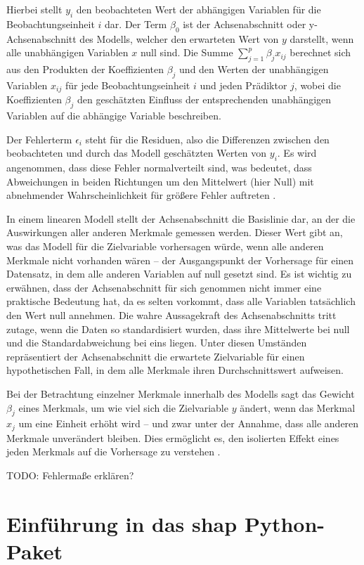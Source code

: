Hierbei stellt $y_i$ den beobachteten Wert der abhängigen Variablen für die Beobachtungseinheit
$i$ dar. Der Term $\beta_0$ ist der Achsenabschnitt oder y-Achsenabschnitt des Modells, 
welcher den erwarteten Wert von $y$ darstellt, wenn alle unabhängigen Variablen $x$ null sind. 
Die Summe $\sum_{j=1}^{p} \beta_j x_{ij}$ berechnet sich aus den Produkten der Koeffizienten 
$\beta_j$ und den Werten der unabhängigen Variablen $x_{ij}$ für jede Beobachtungseinheit $i$ 
und jeden Prädiktor $j$, wobei die Koeffizienten $\beta_j$ den geschätzten Einfluss der 
entsprechenden unabhängigen Variablen auf die abhängige Variable beschreiben.

Der Fehlerterm $\epsilon_i$ steht für die Residuen, also die Differenzen zwischen den beobachteten 
und durch das Modell geschätzten Werten von $y_i$. Es wird angenommen, dass diese Fehler normalverteilt sind, 
was bedeutet, dass Abweichungen in beiden Richtungen um den Mittelwert (hier Null) 
mit abnehmender Wahrscheinlichkeit für größere Fehler auftreten \cite[S. 37]{Molnar_2022}.

In einem linearen Modell stellt der Achsenabschnitt die Basislinie dar, an der die Auswirkungen aller 
anderen Merkmale gemessen werden. Dieser Wert gibt an, was das Modell für die Zielvariable vorhersagen 
würde, wenn alle anderen Merkmale nicht vorhanden wären – der Ausgangspunkt der Vorhersage 
für einen Datensatz, in dem alle anderen Variablen auf null gesetzt sind. 
Es ist wichtig zu erwähnen, dass der Achsenabschnitt für sich genommen nicht immer eine praktische 
Bedeutung hat, da es selten vorkommt, dass alle Variablen tatsächlich den Wert null annehmen. 
Die wahre Aussagekraft des Achsenabschnitts tritt zutage, wenn die Daten so standardisiert wurden, 
dass ihre Mittelwerte bei null und die Standardabweichung bei eins liegen. Unter diesen Umständen repräsentiert der Achsenabschnitt 
die erwartete Zielvariable für einen hypothetischen Fall, in dem alle Merkmale ihren Durchschnittswert 
aufweisen.

Bei der Betrachtung einzelner Merkmale innerhalb des Modells sagt das Gewicht $\beta_j$ eines Merkmals, 
um wie viel sich die Zielvariable $y$ ändert, wenn das Merkmal $x_j$ um eine Einheit erhöht wird – und zwar unter 
der Annahme, dass alle anderen Merkmale unverändert bleiben. 
Dies ermöglicht es, den isolierten Effekt eines jeden Merkmals auf die Vorhersage zu verstehen \cite[S. 39]{Molnar_2022}.

TODO: Fehlermaße erklären? 

\section{Einführung in das \textsf{shap} Python-Paket}

